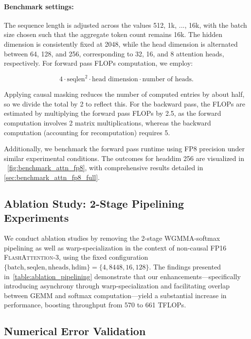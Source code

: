 \begin{algorithm}[H]
\begin{algorithmic}[1]
\paragraph{Benchmark settings:} The sequence length is adjusted across the values 512, 1k, ..., 16k, with the batch size chosen such that the aggregate token count remains 16k. The hidden dimension is consistently fixed at 2048, while the head dimension is alternated between 64, 128, and 256, corresponding to 32, 16, and 8 attention heads, respectively. For forward pass FLOPs computation, we employ:

\begin{equation*}
  4 \cdot \text{seqlen}^2 \cdot \text{head dimension} \cdot \text{number of heads}.
\end{equation*}

Applying causal masking reduces the number of computed entries by about half, so we divide the total by 2 to reflect this. For the backward pass, the FLOPs are estimated by multiplying the forward pass FLOPs by 2.5, as the forward computation involves 2 matrix multiplications, whereas the backward computation (accounting for recomputation) requires 5.

Additionally, we benchmark the forward pass runtime using FP8 precision under similar experimental conditions. The outcomes for headdim 256 are visualized in ~\cref{fig:benchmark_attn_fp8}, with comprehensive results detailed in \cref{sec:benchmark_attn_fp8_full}.

\subsection{Ablation Study: 2-Stage Pipelining Experiments}
\label{sec:2-stage-pipelining-experiments}

We conduct ablation studies by removing the 2-stage WGMMA-softmax pipelining as well as warp-specialization in the context of non-causal FP16 \textsc{FlashAttention-3}, using the fixed configuration $\{\text{batch}, \text{seqlen}, \text{nheads}, \text{hdim}\} = \{ 4, 8448, 16, 128\}$. The findings presented in~\cref{table:ablation_pipelining} demonstrate that our enhancements—specifically introducing asynchrony through warp-specialization and facilitating overlap between GEMM and softmax computation—yield a substantial increase in performance, boosting throughput from 570 to 661 TFLOPs.

\subsection{Numerical Error Validation}
\label{sec:numerical_error}


\end{algorithmic}
\end{algorithm}
